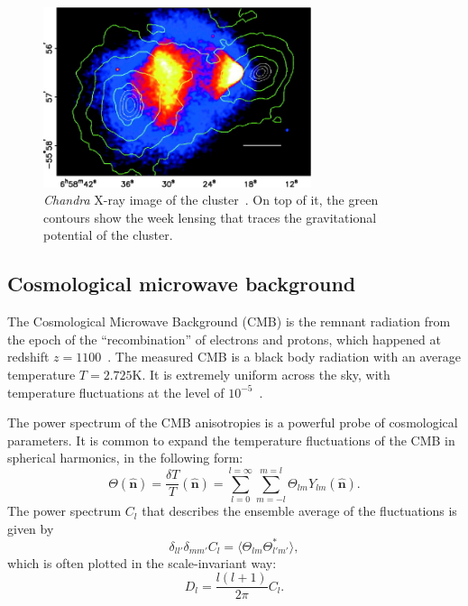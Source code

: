 \documentclass[doublespace,nopageskip]{VTthesis}
\begin{document}
\begin{figure}[htb]
    \centering
    \includegraphics[width=0.7\textwidth]{Figures/Intro/bullet.jpg}
    \caption{\textit{Chandra} X-ray image of the cluster~\cite{2006ApJ...648L.109C}.  On top of it, the green contours show the week lensing that traces the gravitational potential of the cluster. }
    \label{fig:bullet}
\end{figure}

\subsection{Cosmological microwave background}

The Cosmological Microwave Background (CMB) is the remnant radiation from the epoch of the ``recombination'' of electrons and protons, which happened at redshift $z = 1100$~\cite{2003moco.book.....D}. The measured CMB is a black body radiation with an average temperature $T = 2.725$K. It is extremely uniform across the sky, with temperature fluctuations at the level of $10^{-5}$~\cite{2002ARA&A..40..171H}. 

The power spectrum of the CMB anisotropies is a powerful probe of cosmological parameters. It is common to expand the temperature fluctuations of the CMB in spherical harmonics, in the following form:
\begin{equation}
    \Theta(\hat{\bm n}) = \frac{\delta T}{T}(\hat{\bm n}) = \sum^{l=\infty}_{l=0}\sum^{m=l}_{m=-l} \Theta_{lm}Y_{lm}(\hat{\bm n}).
\end{equation}
The power spectrum $C_l$ that describes the ensemble average of the fluctuations is given by
\begin{equation}
    \delta_{ll'}\delta_{mm'}C_l = \langle\Theta_{lm}\Theta^*_{l'm'}\rangle,
\end{equation}
which is often plotted in the scale-invariant way:
\begin{equation}
    D_l = \frac{l(l+1)}{2\pi}C_l.
\end{equation}
\end{document}
